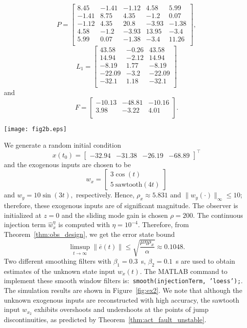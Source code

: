 \documentclass[times, doublespace]{rncauth}
\begin{document}
\[
P = \begin{bmatrix}
8.45 & -1.41 & -1.12 & 4.58 & 5.99 \\ 
-1.41 & 8.75 & 4.35 & -1.2 & 0.07 \\ 
-1.12 & 4.35 & 20.8 & -3.93 & -1.38 \\ 
4.58 & -1.2 & -3.93 & 13.95 & -3.4 \\ 
5.99 & 0.07 & -1.38 & -3.4 & 11.26 \\ 
\end{bmatrix},\]
\[
L_1 = \begin{bmatrix}
43.58 & -0.26 & 43.58 \\ 
14.94 & -2.12 & 14.94 \\ 
-8.19 & 1.77 & -8.19 \\ 
-22.09 & -3.2 & -22.09 \\ 
-32.1 & 1.18 & -32.1 \\ 
\end{bmatrix}
\]
and
\[
F = \begin{bmatrix}
-10.13 & -48.81 & -10.16 \\ 
3.98 & -3.22 & 4.01 \\ 
\end{bmatrix}.
\]
\begin{figure*}[!ht]
	\centering
	\texttt{[image: fig2b.eps]}
	\caption{Simulation Results. (Top left) The actual (blue) and estimated (red dashed) trajectories of the unmeasured state $x_2(t)$ are shown. (Top right) Zoom-in of error trajectory and the computed plant state error bound. We note that the bound (black dashed) is not conservative. (Bottom) We illustrate that the exogenous inputs are estimated with high accuracy.}
	\label{fig:ex2}
\end{figure*}
We generate a random initial condition 
\[
x(t_0) =\begin{bmatrix}
-32.94 & 
-31.38 & 
-26.19 & 
-68.89  
\end{bmatrix}^\top
\] and the exogenous inputs are chosen to be 
\[w_x = \begin{bmatrix}
3\cos(t) \\ 5~\mathrm{sawtooth}(4t)
\end{bmatrix}
\] and $w_y = 10\sin(3t),$ respectively. Hence, $\rho_x\approx 5.831$ and $\|w_y(\cdot)\|_\infty\le 10$; therefore, these exogenous inputs are of significant magnitude. The observer is initialized at $z = 0$ and the sliding mode gain is chosen $\rho=200$. The continuous injection term $\hat w^\eta_x$ is computed with $\eta = 10^{-4}$.
Therefore, from Theorem~\ref{thm:obs_design}, we get the error state bound
\[
\limsup_{t\to\infty} \|\bar e(t)\|\le \sqrt{\frac{\mu\eta\rho_x}{\alpha}} \approx 0.1048.
\]
Two different smoothing filters with $\beta_1 = 0.3$~s, $\beta_2 = 0.1$~s are used to obtain estimates of the unknown state input $w_x(t)$. The MATLAB command to implement these smooth window filters is:~\texttt{smooth(injectionTerm, 'loess');}. The simulation results are shown in Figure~\ref{fig:ex2}. We note that although the unknown exogenous inputs are reconstructed with high accuracy, the sawtooth input $w_{x_2}$ exhibits overshoots and undershoots at the points of jump discontinuities, as predicted by Theorem~\ref{thm:act_fault_unstable}.
\end{document}
